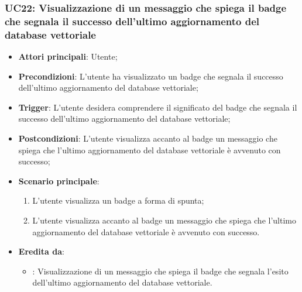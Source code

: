 \subsubsection{UC22: Visualizzazione di un messaggio che spiega il badge che segnala il successo dell'ultimo aggiornamento del database vettoriale}
\begin{itemize}
    \item \textbf{Attori principali}: Utente;
    \item \textbf{Precondizioni}: L'utente ha visualizzato un badge che segnala il successo dell'ultimo aggiornamento del database vettoriale;
    \item \textbf{Trigger}: L'utente desidera comprendere il significato del badge che segnala il successo dell'ultimo aggiornamento del database vettoriale;
    \item \textbf{Postcondizioni}: L'utente visualizza accanto al badge un messaggio che spiega che l'ultimo aggiornamento del database vettoriale è avvenuto con successo;
    \item \textbf{Scenario principale}:
    \begin{enumerate}
        \item L'utente visualizza un badge a forma di spunta;
        \item L'utente visualizza accanto al badge un messaggio che spiega che l'ultimo aggiornamento del database vettoriale è avvenuto con successo.
    \end{enumerate}
    \item \textbf{Eredita da}:
    \begin{itemize}
        \item {}: Visualizzazione di un messaggio che spiega il badge che segnala l'esito dell'ultimo aggiornamento del database vettoriale.
    \end{itemize}
\end{itemize}

\hypertarget{UC23}{}
